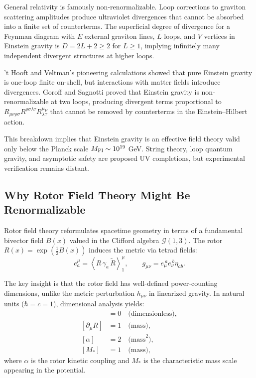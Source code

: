 \documentclass[11pt,a4paper]{article}
\numberwithin{equation}{section}
\theoremstyle{plain}
\theoremstyle{definition}
\theoremstyle{remark}
\newcommand{\Cl}{\mathcal{G}}               %
\newcommand{\rev}[1]{\widetilde{#1}}        %
\newcommand{\grade}[2]{\left\langle #1 \right\rangle_{#2}}
\begin{document}
General relativity is famously non-renormalizable. Loop corrections to graviton scattering amplitudes produce ultraviolet divergences that cannot be absorbed into a finite set of counterterms. The superficial degree of divergence for a Feynman diagram with $E$ external graviton lines, $L$ loops, and $V$ vertices in Einstein gravity is $D=2L+2\geq 2$ for $L\geq 1$, implying infinitely many independent divergent structures at higher loops.

't Hooft and Veltman's pioneering calculations showed that pure Einstein gravity is one-loop finite on-shell, but interactions with matter fields introduce divergences. Goroff and Sagnotti proved that Einstein gravity is non-renormalizable at two loops, producing divergent terms proportional to $R_{\mu\nu\rho\sigma}R^{\rho\sigma\lambda\tau}R_\lambda^\mu{}_\tau^\nu$ that cannot be removed by counterterms in the Einstein--Hilbert action.

This breakdown implies that Einstein gravity is an effective field theory valid only below the Planck scale $M_{\rm Pl}\sim 10^{19}$ GeV. String theory, loop quantum gravity, and asymptotic safety are proposed UV completions, but experimental verification remains distant.

\subsection{Why Rotor Field Theory Might Be Renormalizable}

Rotor field theory reformulates spacetime geometry in terms of a fundamental bivector field $B(x)$ valued in the Clifford algebra $\Cl(1,3)$. The rotor $R(x)=\exp(\tfrac12 B(x))$ induces the metric via tetrad fields:
\begin{equation}
e_a^\mu = \grade{R\,\gamma_a\,\rev{R}}{1}^\mu, \qquad g_{\mu\nu}=e_\mu^{\ a}e_\nu^{\ b}\eta_{ab}.
\label{eq:metric-rotor}
\end{equation}

The key insight is that the rotor field has well-defined power-counting dimensions, unlike the metric perturbation $h_{\mu\nu}$ in linearized gravity. In natural units ($\hbar=c=1$), dimensional analysis yields:
\begin{align}
[R] &= 0 \quad\text{(dimensionless)}, \label{eq:dim-R}\\
[\partial_\mu R] &= 1 \quad\text{(mass)}, \label{eq:dim-dR}\\
[\alpha] &= 2 \quad\text{(mass}^2\text{)}, \label{eq:dim-alpha}\\
[M_*] &= 1 \quad\text{(mass)},\label{eq:dim-Mstar}
\end{align}
where $\alpha$ is the rotor kinetic coupling and $M_*$ is the characteristic mass scale appearing in the potential.
\end{document}
